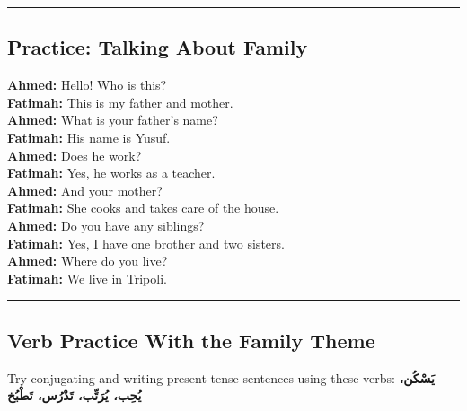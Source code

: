 \documentclass[
  a4paper,
  DIV=11,
  numbers=noendperiod]{scrartcl}
\begin{document}
\begin{center}\rule{0.5\linewidth}{0.5pt}\end{center}

\begin{tcolorbox}[enhanced jigsaw, bottomrule=.15mm, arc=.35mm, colbacktitle=quarto-callout-caution-color!10!white, opacityback=0, toptitle=1mm, title=\textcolor{quarto-callout-caution-color}{\faFire}\hspace{0.5em}{Click to Practice a Dialogue}, colframe=quarto-callout-caution-color-frame, opacitybacktitle=0.6, colback=white, coltitle=black, titlerule=0mm, left=2mm, toprule=.15mm, bottomtitle=1mm, rightrule=.15mm, leftrule=.75mm, breakable]

\subsection{Practice: Talking About
Family}\label{practice-talking-about-family}

\textbf{Ahmed:} Hello! Who is this?\\
\textbf{Fatimah:} This is my father and mother.\\
\textbf{Ahmed:} What is your father's name?\\
\textbf{Fatimah:} His name is Yusuf.\\
\textbf{Ahmed:} Does he work?\\
\textbf{Fatimah:} Yes, he works as a teacher.\\
\textbf{Ahmed:} And your mother?\\
\textbf{Fatimah:} She cooks and takes care of the house.\\
\textbf{Ahmed:} Do you have any siblings?\\
\textbf{Fatimah:} Yes, I have one brother and two sisters.\\
\textbf{Ahmed:} Where do you live?\\
\textbf{Fatimah:} We live in Tripoli.

\end{tcolorbox}

\begin{center}\rule{0.5\linewidth}{0.5pt}\end{center}

\subsection{Verb Practice With the Family
Theme}\label{verb-practice-with-the-family-theme}

Try conjugating and writing present-tense sentences using these verbs:
\textbf{يَسْكُن، يُحِب، يُرَتِّب، تَدْرُس، تَطْبُخ}
\end{document}
